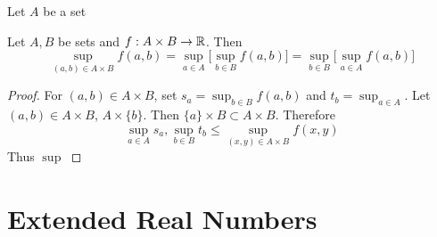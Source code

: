 \documentclass{book}
\begin{document}
	
	\begin{defn}
		Let $A$ be a set
	\end{defn}
	
	\begin{ex}
		Let $A,B$ be sets and $f:A \times B \rightarrow \mathbb{R}$. Then 
		$$\sup_{(a,b) \in A \times B} f(a,b) = \sup_{a \in A} \bigg[ \sup_{b \in B} f(a,b) \bigg] =  \sup_{b \in B} \bigg[ \sup_{a \in A} f(a,b) \bigg]$$
	\end{ex}

	\begin{proof}
		For $(a,b) \in A \times B$, set $s_a = \sup_{b \in B} f(a,b)$ and $t_b = \sup_{a \in A}$. Let $(a,b) \in A \times B$, $A \times \{b\}$. Then $\{a\} \times B \subset A \times B$. Therefore 
		$$\sup_{a \in A} s_a, \sup_{b \in B} t_b \leq \sup_{(x,y) \in A \times B} f(x,y)$$
		Thus $\sup_{}$
	\end{proof}
	
	
	
	
	
	
	
	
	
	
	
	
	
	
	
	
	
	
	
	
	
	
	
	
	
	
	
	
	
	
	\section{Extended Real Numbers}
	
	
\end{document}

